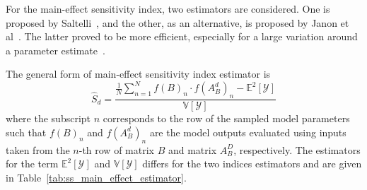 
For the main-effect sensitivity index, two estimators are considered.
One is proposed by Saltelli~\cite{Saltelli2002}, and the other, as an alternative, is proposed by Janon et al~\cite{Janon2014}.
The latter proved to be more efficient, especially for a large variation around a parameter estimate~\cite{Iooss2015,Janon2014}.

The general form of main-effect sensitivity index estimator is
\begin{equation}
  \widehat{S}_d = \frac{\frac{1}{N}\sum_{n=1}^N f(B)_n \cdot f(A_B^d)_n - \mathbb{E}^2[\mathcal{Y}]}{\mathbb{V}[\mathcal{Y}]}
\label{eq:ss_main_effect_estimator}
\end{equation}
where the subscript $n$ corresponds to the row of the sampled model parameters 
such that $f(B)_n$ and $f(A^d_B)_n$ are the model outputs evaluated using inputs taken from the $n$-th row of matrix $B$ 
and matrix $A_B^D$, respectively.
The estimators for the term $\mathbb{E}^2[\mathcal{Y}]$ and $\mathbb{V}[\mathcal{Y}]$ differs for the two indices estimators and are given in Table~\ref{tab:ss_main_effect_estimator}.

